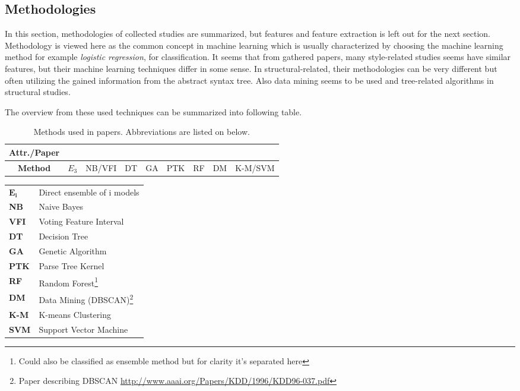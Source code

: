 \documentclass[english]{tktltiki2}
\theoremstyle{definition}
\theoremstyle{remark}
\begin{document}
\subsection{Methodologies}
\label{chap:meth}
In this section, methodologies of collected studies are summarized, but features and feature extraction is left out for the next section. Methodology is viewed here as the common concept in machine learning which is usually characterized by choosing the machine learning method for example \textit{logistic regression}, for classification. It seems that from gathered papers, many style-related studies seems have similar features, but their machine learning techniques differ in some sense. In structural-related, their methodologies can be very different but often utilizing the gained information from the abstract syntax tree. Also data mining seems to be used and tree-related algorithms in structural studies.  

The overview from these used techniques can be summarized into following table.

\begin{table}[ht]
\centering
\begin{tabular}{c|cccccccc}
\textbf{Attr./Paper} & \cite{bandara2011machine}   & \cite{kothari2007probabilistic}   & \cite{Elenbogen:2008:DOS:1295109.1295123}  & \cite{lange2007using}    & \cite{Son:2013:APS:2508269.2508323}   & \cite{caliskan2015anonymizing}    & \cite{jadalla2008pde4java}   & \cite{rosenblum2011wrote}   \\ \hline
\textbf{Method}        & $E_3$ & NB/VFI & DT & GA & PTK & RF  & DM & K-M/SVM \\
\end{tabular}
\caption{Methods used in papers. Abbreviations are listed on below.}
\label{table:meth}
\end{table}

\begin{longtable}{ll}

{$\mathbf{E_i}$} & Direct ensemble of i models \\
\textbf{NB} & Naive Bayes\\
\textbf{VFI} & Voting Feature Interval\\
\textbf{DT} & Decision Tree\\
\textbf{GA} & Genetic Algorithm\\
\textbf{PTK} & Parse Tree Kernel\\
\textbf{RF} & Random Forest\footnote{Could also be classified as ensemble method but for clarity it's separated here}\\
\textbf{DM} & Data Mining (DBSCAN)\footnote{Paper describing DBSCAN \url{http://www.aaai.org/Papers/KDD/1996/KDD96-037.pdf}}\\
\textbf{K-M} & K-means Clustering\\
\textbf{SVM} & Support Vector Machine

\end{longtable}
\end{document}

